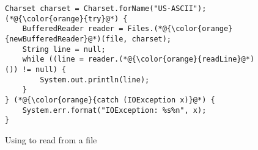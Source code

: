 \begin{figure}[htbp]
	\centering
\begin{lstlisting}[]
Charset charset = Charset.forName("US-ASCII");
(*@{\color{orange}{try}@*) {
    BufferedReader reader = Files.(*@{\color{orange}{newBufferedReader}@*)(file, charset);
    String line = null;
    while ((line = reader.(*@{\color{orange}{readLine}@*)()) != null) {
        System.out.println(line);
    }
} (*@{\color{orange}{catch (IOException x)}@*) {
    System.err.format("IOException: %s%n", x);
}
\end{lstlisting}
        \vspace{-12pt}
        \caption{Using  to read from a file}
        \label{fig:example4}
\end{figure}

